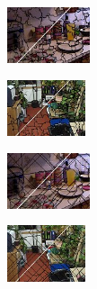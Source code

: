 \begin{figure}
\begin{subfigure}[b]{0.129\textwidth}
	\end{subfigure}\\
	\begin{subfigure}[b]{0.02\textwidth}
	\end{subfigure}
	\begin{subfigure}[b]{0.1375\textwidth}
		\includegraphics[height=1.65cm]{pictures/nyuv2/qs/cropped/qs_00000561_contours}
	\end{subfigure}
	\begin{subfigure}[b]{0.129\textwidth}
		\includegraphics[height=1.65cm]{pictures/sunrgbd/qs/cropped/qs_00004732_contours}
	\end{subfigure}
	\begin{subfigure}[b]{0.02\textwidth}
	\end{subfigure}
	\begin{subfigure}[b]{0.1375\textwidth}
		\includegraphics[height=1.65cm]{pictures/nyuv2/pf/cropped/pf_00000561_contours}
	\end{subfigure}
	\begin{subfigure}[b]{0.129\textwidth}
		\includegraphics[height=1.65cm]{pictures/sunrgbd/pf/cropped/pf_00004732_contours}
	\end{subfigure}
	\begin{subfigure}[b]{0.02\textwidth}
	\end{subfigure}

\end{figure}
